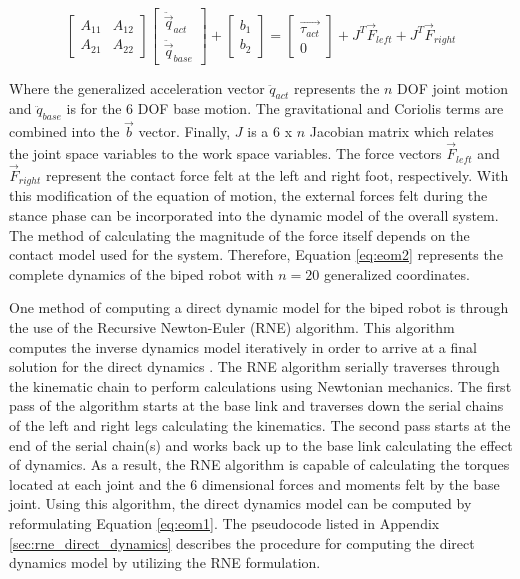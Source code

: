 \begin{equation}
	\label{eq:eom2}
	\begin{bmatrix} A_{11} & A_{12} \\ A_{21} & A_{22} \end{bmatrix} 
	\begin{bmatrix} \ddot{\vec{q}}_{act} \\ \ddot{\vec{q}}_{base} \end{bmatrix} + 
	\begin{bmatrix} b_{1} \\ b_{2} \end{bmatrix} = 
	\begin{bmatrix} \vec{\tau_{act}} \\ 0 \end{bmatrix} + 
    J^{T}\vec{F}_{left} + J^{T}\vec{F}_{right}
\end{equation}

Where the generalized acceleration vector $\ddot{q}_{act}$ represents the $n$ DOF joint motion and $\ddot{q}_{base}$ is for the 6 DOF base motion. The gravitational and Coriolis terms are combined into the $\vec{b}$ vector. Finally, $J$ is a 6 x $n$ Jacobian matrix which relates the joint space variables to the work space variables. The force vectors $\vec{F}_{left}$ and $\vec{F}_{right}$ represent the contact force felt at the left and right foot, respectively. With this modification of the equation of motion, the external forces felt during the stance phase can be incorporated into the dynamic model of the overall system. The method of calculating the magnitude of the force itself depends on the contact model used for the system. Therefore, Equation \ref{eq:eom2} represents the complete dynamics of the biped robot with $n = 20$ generalized coordinates.

One method of computing a direct dynamic model for the biped robot is through the use of the Recursive Newton-Euler (RNE) algorithm. This algorithm computes the inverse dynamics model iteratively in order to arrive at a final solution for the direct dynamics \cite{Perrin:1997wn}. The RNE algorithm serially traverses through the kinematic chain to perform calculations using Newtonian mechanics. The first pass of the algorithm starts at the base link and traverses down the serial chains of the left and right legs calculating the kinematics. The second pass starts at the end of the serial chain(s) and works back up to the base link calculating the effect of dynamics. As a result, the RNE algorithm is capable of calculating the torques located at each joint and the 6 dimensional forces and moments felt by the base joint. Using this algorithm, the direct dynamics model can be computed by reformulating Equation \ref{eq:eom1}. The pseudocode listed in Appendix \ref{sec:rne_direct_dynamics} describes the procedure for computing the direct dynamics model by utilizing the RNE formulation.


